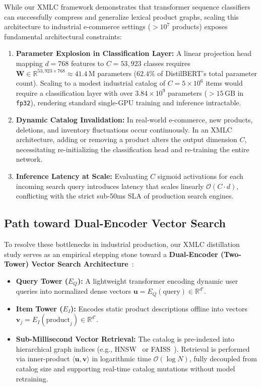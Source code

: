 \documentclass[11pt]{article}
\begin{document}
While our XMLC framework demonstrates that transformer sequence classifiers can successfully compress and generalize lexical product graphs, scaling this architecture to industrial e-commerce settings ($>10^7$ products) exposes fundamental architectural constraints:
\begin{enumerate}
  \item \textbf{Parameter Explosion in Classification Layer:} A linear projection head mapping $d = 768$ features to $C = 53{,}923$ classes requires $\mathbf{W} \in \mathbb{R}^{53{,}923 \times 768} \approx 41.4\,\text{M}$ parameters ($62.4\%$ of DistilBERT's total parameter count). Scaling to a modest industrial catalog of $C = 5 \times 10^6$ items would require a classification layer with over $3.84 \times 10^9$ parameters ($>15\,\text{GB}$ in \texttt{fp32}), rendering standard single-GPU training and inference intractable.
  \item \textbf{Dynamic Catalog Invalidation:} In real-world e-commerce, new products, deletions, and inventory fluctuations occur continuously. In an XMLC architecture, adding or removing a product alters the output dimension $C$, necessitating re-initializing the classification head and re-training the entire network.
  \item \textbf{Inference Latency at Scale:} Evaluating $C$ sigmoid activations for each incoming search query introduces latency that scales linearly $\mathcal{O}(C \cdot d)$, conflicting with the strict sub-50ms SLA of production search engines.
\end{enumerate}

\subsection{Path toward Dual-Encoder Vector Search}
To resolve these bottlenecks in industrial production, our XMLC distillation study serves as an empirical stepping stone toward a \textbf{Dual-Encoder (Two-Tower) Vector Search Architecture}~\cite{dpr}:
\begin{itemize}
  \item \textbf{Query Tower ($E_Q$):} A lightweight transformer encoding dynamic user queries into normalized dense vectors $\mathbf{u} = E_Q(\text{query}) \in \mathbb{R}^{d'}$.
  \item \textbf{Item Tower ($E_I$):} Encodes static product descriptions offline into vectors $\mathbf{v}_j = E_I(\text{product}_j) \in \mathbb{R}^{d'}$.
  \item \textbf{Sub-Millisecond Vector Retrieval:} The catalog is pre-indexed into hierarchical graph indices (e.g., HNSW~\cite{hnsw} or FAISS~\cite{faiss}). Retrieval is performed via inner-product $\langle \mathbf{u}, \mathbf{v} \rangle$ in logarithmic time $\mathcal{O}(\log N)$, fully decoupled from catalog size and supporting real-time catalog mutations without model retraining.
\end{itemize}
\end{document}
